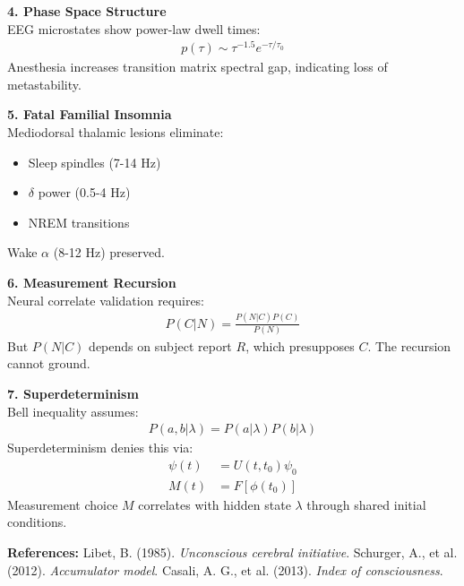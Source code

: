 \begin{technical}
    \textbf{4. Phase Space Structure}\\[0.3em]
    EEG microstates show power-law dwell times:
    \begin{align*}
        p(\tau) \sim \tau^{-1.5}e^{-\tau/\tau_0}
    \end{align*}
    Anesthesia increases transition matrix spectral gap, indicating loss of metastability.

    \textbf{5. Fatal Familial Insomnia}\\[0.3em]
    Mediodorsal thalamic lesions eliminate:
    \begin{itemize}
        \item Sleep spindles (7-14 Hz)
        \item $\delta$ power (0.5-4 Hz)
        \item NREM transitions
    \end{itemize}
    Wake $\alpha$ (8-12 Hz) preserved.

    \textbf{6. Measurement Recursion}\\[0.3em]
    Neural correlate validation requires:
    \begin{align*}
        P(C|N) = \frac{P(N|C)P(C)}{P(N)}
    \end{align*}
    But $P(N|C)$ depends on subject report $R$, which presupposes $C$. The recursion cannot ground.

    \textbf{7. Superdeterminism}\\[0.3em]
    Bell inequality assumes:
    \begin{align*}
        P(a,b|\lambda) = P(a|\lambda)P(b|\lambda)
    \end{align*}
    Superdeterminism denies this via:
    \begin{align*}
        \psi(t) &= U(t,t_0)\psi_0\\
        M(t) &= F[\phi(t_0)]
    \end{align*}
    Measurement choice $M$ correlates with hidden state $\lambda$ through shared initial conditions.

    \vspace{0.5em}
    \textbf{References:}\newline
    Libet, B. (1985). \emph{Unconscious cerebral initiative}.\newline
    Schurger, A., et al. (2012). \emph{Accumulator model}.\newline
    Casali, A. G., et al. (2013). \emph{Index of consciousness}.
\end{technical}